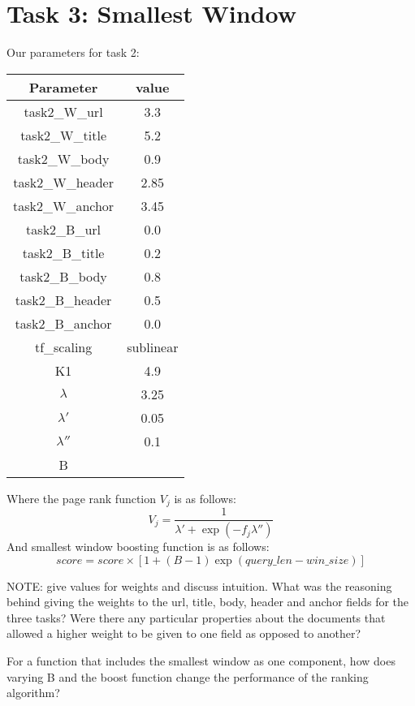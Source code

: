 \documentclass[10pt,twocolumn]{article}
\begin{document}
\section{Task 3: Smallest Window}
Our parameters for task 2:
\begin{table}[H]
\centering
\begin{tabular}{|c|c|}
\hline
Parameter & value \\\hline
task2\_W\_url & 3.3\\\hline
task2\_W\_title & 5.2\\\hline
task2\_W\_body & 0.9\\\hline
task2\_W\_header & 2.85\\\hline
task2\_W\_anchor & 3.45\\\hline
task2\_B\_url & 0.0\\\hline
task2\_B\_title & 0.2\\\hline
task2\_B\_body & 0.8\\\hline
task2\_B\_header & 0.5\\\hline
task2\_B\_anchor & 0.0\\\hline
tf\_scaling & sublinear\\\hline
K1 & 4.9\\\hline
$\lambda$ & 3.25\\\hline
$\lambda'$ & 0.05\\\hline
$\lambda''$ & 0.1\\\hline
B & \\\hline

\end{tabular}
\end{table}
Where the page rank function $V_j$ is as follows:
\begin{equation*}
V_j = \frac{1}{\lambda'+\exp({-f_j\lambda''})}
\end{equation*}
And smallest window boosting function is as follows:
\begin{equation*}
score = score \times [1+(B-1)\exp(query\_len-win\_size)]
\end{equation*}

NOTE: give values for weights and discuss intuition.
What was the reasoning behind giving the weights to the url, title,
body, header and anchor fields for the three tasks? Were there any
particular properties about the documents that allowed a higher weight
to be given to one field as opposed to another?

For a function that includes the smallest window as one component,
how does varying B and the boost function change the performance
of the ranking algorithm?
\end{document}
